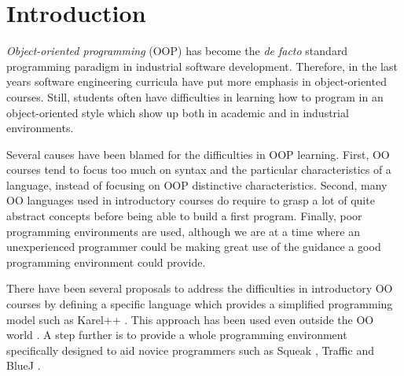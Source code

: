 \section{Introduction}
\label{sec:intro}


\emph{Object-oriented programming} (OOP) has become the \textit{de facto} standard programming paradigm in industrial software development.
Therefore, in the last years software engineering curricula have put more emphasis in object-oriented courses.
Still, students often have difficulties in learning how to program in an object-oriented style which show up both in academic and in industrial environments.

Several causes have been blamed for the difficulties in OOP learning.
First, OO courses tend to focus too much on syntax and the particular characteristics of a language, instead of focusing on OOP distinctive characteristics.
Second, many OO languages used in introductory courses do require to grasp a lot of quite abstract concepts before being able to build a first program.
Finally, poor programming environments are used, although we are at a time where an unexperienced programmer could be making great use of the guidance a good programming environment could provide.

\medskip 


There have been several proposals to address the difficulties in introductory OO courses 
by defining a specific language which provides a simplified programming model such as Karel++ \cite{bergin_karel++:_1996} .
This approach has been used even outside the OO world \cite{feurzeig_programming-languages_1970, pattis_karel_1981, lopez_nombre_2012}.
A step further is to provide a whole programming environment specifically designed to aid novice programmers 
such as Squeak \cite{ingalls_back_1997}, Traffic \cite{broy_outside-method_2003} and BlueJ \cite{bennedsen_bluej_2010}. 

